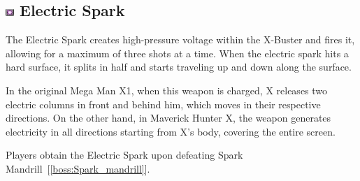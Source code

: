\subsection{\includegraphics[width=12px, height=10px]{figures/X1/weapons/E_Spark.jpg} Electric Spark}\label{Electric_spark}
The Electric Spark creates high-pressure voltage within the X-Buster and fires it, allowing for a maximum of three shots at a time. When the electric spark hits a hard surface, it splits in half and starts traveling up and down along the surface.

In the original Mega Man X1, when this weapon is charged, X releases two electric columns in front and behind him, which moves in their respective directions. On the other hand, in Maverick Hunter X, the weapon generates electricity in all directions starting from X's body, covering the entire screen. 

Players obtain the Electric Spark upon defeating Spark Mandrill~[\ref{boss:Spark_mandrill}].

